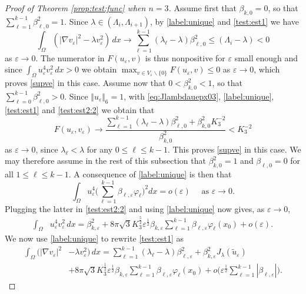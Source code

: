 \documentclass[10pt]{amsart}
\numberwithin{equation}{section}
\newcommand{\ve}{\varepsilon}
\newcommand{\vp}{\varphi}
\newcommand{\Om}{\Omega}
\theoremstyle{plain}
\theoremstyle{remark}
\begin{document}
\begin{proof}[Proof of Theorem \ref{prop:test:func} when $n=3$]
Assume first that $\beta_{k,0} = 0$, so that $\sum_{\ell=1}^{k-1} \beta_{\ell,0}^2 = 1$. Since $\lambda \in (\Lambda_i, \Lambda_{i+1})$, by \eqref{label:unique} and \eqref{test:est1} we have 
$$  \int_{\Om} \left( |\nabla v_\ve|^2-\lambda v_\ve^2\right)\, dx \to \sum_{\ell=1}^{k-1} (\lambda_\ell - \lambda) \beta_{\ell,0}^2 \le  (\Lambda_i - \lambda) < 0 $$
as $\ve \to 0$. The numerator in $F(u_\ve, v)$ is thus nonpositive for $\ve$ small enough and since $\int_{\Om} u_{\ve}^{4}v_{\ve}^2\, dx >0$ we obtain $ \max_{ v \in V_{\ve} \backslash \{0\} } F(u_\ve,v) \le 0$ as $\ve \to 0$, which proves \eqref{supve} in this case. Assume now that $0 <\beta_{k,0}^2 < 1$, so that $\sum_{\ell=0}^{k-1} \beta_{\ell,0}^2 >0$. Since $\Vert u_\ve \Vert_{6}= 1$,  with  \eqref{eq:Jlambdauepx03}, \eqref{label:unique},  \eqref{test:est1} and \eqref{test:est2:2} we obtain that 
$$ F(u_\ve, v_\ve) \to \frac{\sum_{\ell=1}^{k-1} (\lambda_\ell - \lambda) \beta_{\ell,0}^2 + \beta_{k,0}^2 K_3^{-2}}{\beta_{k,0}^2} < K_3^{-2}  $$
as $\ve \to 0$, since $\lambda_\ell < \lambda$ for any $0 \le \ell \le k-1$. This proves \eqref{supve} in this case. We may therefore assume in the rest of this subsection that $\beta_{k,0}^2 = 1$ and $\beta_{\ell,0} = 0$ for all $1 \le \ell \le k-1$. A consequence of \eqref{label:unique} is then that
$$ \int_{\Om} u_\ve^{4}\big( \sum_{\ell=1}^{k-1} \beta_{\ell,\ve} \vp_\ell \big)^2dx = o(\ve) \quad \text{ as } \ve \to 0.$$ 
Plugging the latter in \eqref{test:est2:2} and using \eqref{label:unique}  now gives, as $\ve \to 0$,
\begin{equation} \label{test:est2}
\begin{aligned}
	\int_{\Om}& u_{\ve}^{4}v_{\ve}^2\, dx  =  \beta_{k, \ve}^2 + 8 \pi \sqrt{3} K_3^{\frac{5}{2}} \ve^{\frac{1}{2}}\beta_{k,\ve}\sum_{\ell=1}^{k-1}\beta_{\ell,\ve}\vp_\ell(x_0) + o(\ve) . 
\end{aligned} 
\end{equation}
We now use \eqref{label:unique} to rewrite \eqref{test:est1} as 
\begin{equation} \label{calculs:31}
\begin{aligned}
  \int_{\Om} \Big( |\nabla v_\ve|^2& -\lambda v_\ve^2\Big)\, dx  = \sum_{\ell=1}^{k-1} (\lambda_\ell - \lambda) \beta_{\ell,\ve}^2+ \beta_{k, \ve}^2 J_{\lambda}(\tilde{u}_\ve) \\
& + 8 \pi \sqrt{3}K_3^{\frac12}  \ve^{\frac12} \beta_{k,\ve}\sum_{\ell=1}^{k-1}  \beta_{\ell,\ve} \vp_\ell(x_0) + o\Big(  \ve^{\frac12} \sum_{\ell=1}^{k-1} |\beta_{\ell,\ve}| \Big).
\end{aligned}

\end{equation}
\end{proof}
\end{document}
